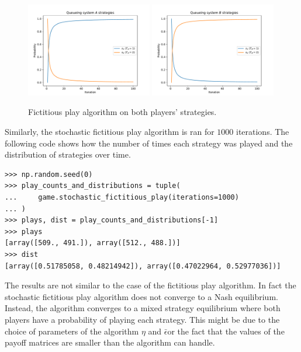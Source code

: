 \begin{figure}[H]
    \centering
    \includegraphics[width=0.49\textwidth]{chapters/04_game_theoretic_model/img/numeric_results/fictitious_play_A.pdf}
    \includegraphics[width=0.49\textwidth]{chapters/04_game_theoretic_model/img/numeric_results/fictitious_play_B.pdf}
    \caption{Fictitious play algorithm on both players' strategies.}
    \label{fig:solving_game_fictitious_example}
\end{figure}

Similarly, the stochastic fictitious play algorithm is ran for \(1000\)
iterations.
The following code shows how the number of times each strategy was played and
the distribution of strategies over time.

\begin{lstlisting}[style=pystyle]
>>> np.random.seed(0)
>>> play_counts_and_distributions = tuple(
...     game.stochastic_fictitious_play(iterations=1000)
... )
>>> plays, dist = play_counts_and_distributions[-1]
>>> plays
[array([509., 491.]), array([512., 488.])]
>>> dist
[array([0.51785058, 0.48214942]), array([0.47022964, 0.52977036])]

\end{lstlisting}

The results are not similar to the case of the fictitious play algorithm.
In fact the stochastic fictitious play algorithm does not converge to a Nash
equilibrium.
Instead, the algorithm converges to a mixed strategy equilibrium where both
players have a probability of playing each strategy.
This might be due to the choice of parameters of the algorithm \(\eta\) and
\(\bar{\epsilon}\)or the fact that the values of the payoff matrices are
smaller than the algorithm can handle.


